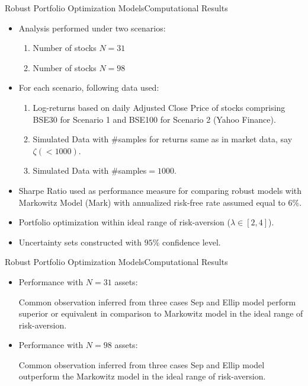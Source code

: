 \documentclass{beamer}
\begin{document}
\begin{frame}{Robust Portfolio Optimization Models}{Computational Results}
\begin{itemize}
    \item{Analysis performed under two scenarios:
    \begin{enumerate}
        \item{Number of stocks $N=31$}
        \item{Number of stocks $N=98$}
    \end{enumerate}
    }
    \item{For each scenario, following data used:
    \begin{enumerate}
        \item{Log-returns based on daily Adjusted Close Price of stocks comprising BSE30 for Scenario 1 and BSE100 for Scenario 2 (Yahoo Finance).}
        \item{Simulated Data with $\#$samples for returns same as in market data, say $\zeta (<1000)$.}
        \item{Simulated Data with $\#$samples$=1000$.}
    \end{enumerate}
    }
    \item{Sharpe Ratio used as performance measure for comparing robust models with Markowitz Model (Mark) with annualized risk-free rate assumed equal to $6\%$.}
    \item{Portfolio optimization within ideal range of risk-aversion ($\lambda \in [2,4]$). }
    \item{Uncertainty sets constructed with $95\%$ confidence level. }
\end{itemize}
\end{frame}

\begin{frame}{Robust Portfolio Optimization Models}{Computational Results}

\begin{itemize}
    \item{Performance with $N=31$ assets:
    \begin{block}{Common observation inferred from three cases}
Sep and Ellip model perform superior or equivalent in comparison to Markowitz model in the ideal range of risk-aversion.
\end{block}
    }
    \item{Performance with $N=98$ assets:
    \begin{block}{Common observation inferred from three cases}
Sep and Ellip model outperform the Markowitz model in the ideal range of risk-aversion.
\end{block}
    }
\end{itemize}

\end{frame}
\end{document}
